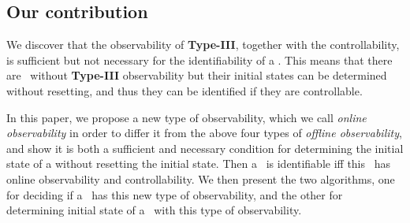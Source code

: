 \subsection{Our contribution}
We discover that the observability of {\bf Type-III}, together with the controllability,  is  sufficient but not necessary for the identifiability of a {\BCN}. This means that there are \BCNs\  without {\bf Type-III} observability but their initial states can be determined without  resetting, and thus they can be identified if they are controllable.

In this paper, we propose a new type of observability, which we call {\em online observability} in order to differ it from the above four types  of {\em  offline observability}, and show it is both a sufficient and necessary condition for determining the initial state of a {\BCN} without resetting the initial state. Then a \BCN\ is identifiable iff this \BCN\ has online observability and controllability. We then present the two algorithms, one for deciding if a \BCN\ has this new type of observability, and the other for determining  initial state of a \BCN\ with this type of observability. 





